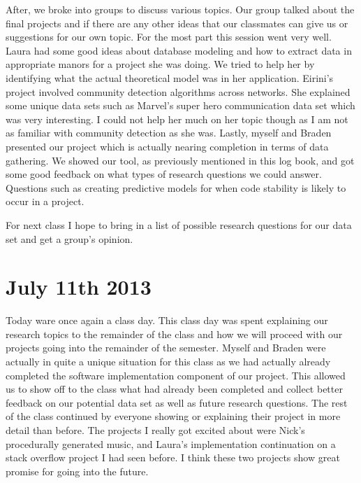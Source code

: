 \documentclass[conference]{IEEEtran}
\begin{document}
After, we broke into groups to discuss various topics. Our group talked about the final projects and if there are
any other ideas that our classmates can give us or suggestions for our own topic. For the most part this session went
very well. Laura had some good ideas about database modeling and how to extract data in appropriate manors for a project
she was doing. We tried to help her by identifying what the actual theoretical model was in her application. Eirini's
project involved community detection algorithms across networks. She explained some unique data sets such as Marvel's
super hero communication data set which was very interesting. I could not help her much on her topic though as I am
not as familiar with community detection as she was. Lastly, myself and Braden presented our project which is actually
nearing completion in terms of data gathering. We showed our tool, as previously mentioned in this log book, and got
some good feedback on what types of research questions we could answer. Questions such as creating predictive models
for when code stability is likely to occur in a project. 

For next class I hope to bring in a list of possible research questions for our data set and get a group's opinion.

\section{July 11th 2013}
Today ware once again a class day. This class day was spent explaining our research topics to the remainder of
the class and how we will proceed with our projects going into the remainder of the semester. Myself and Braden 
were actually in quite a unique situation for this class as we had actually already completed the software implementation
component of our project. This allowed us to show off to the class what had already been completed and collect better
feedback on our potential data set as well as future research questions. The rest of the class continued by everyone
showing or explaining their project in more detail than before. The projects I really got excited about were Nick's
procedurally generated music, and Laura's implementation continuation on a stack overflow project I had seen before.
I think these two projects show great promise for going into the future.
\end{document}
